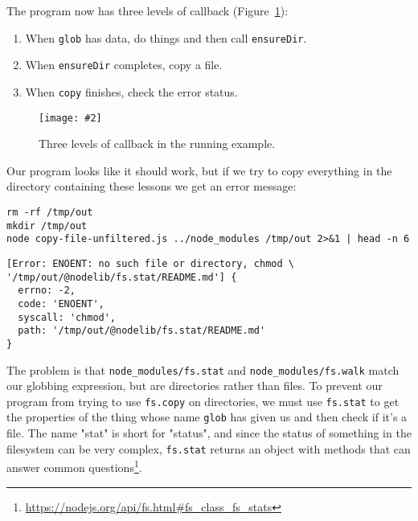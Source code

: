 \documentclass[krantzl]{krantz}
\newcommand{\figpdf}[4]{\begin{figure}%
\centering%
\texttt{[image: \#2]}%
\caption{#3}%
\label{#1}%
\end{figure}}
\newcommand{\figref}[1]{Figure~\ref{#1}}
\newcommand{\hreffoot}[2]{{#1}\footnote{\href{#2}{#2}}}
\begin{document}
The program now has three levels of callback
(\figref{systems-programming-triple-callback}):

\begin{enumerate}

\item 

When \texttt{glob} has data, do things and then call \texttt{ensureDir}.



\item 

When \texttt{ensureDir} completes, copy a file.



\item 

When \texttt{copy} finishes, check the error status.



\end{enumerate}

\figpdf{systems-programming-triple-callback}{./systems-programming/triple-callback.pdf}{Three levels of callback in the running example.}{0.6}


Our program looks like it should work,
but if we try to copy everything in the directory containing these lessons
we get an error message:


\begin{lstlisting}[frame=single,frameround=tttt]
rm -rf /tmp/out
mkdir /tmp/out
node copy-file-unfiltered.js ../node_modules /tmp/out 2>&1 | head -n 6
\end{lstlisting}



\begin{lstlisting}[frame=single,frameround=tttt]
[Error: ENOENT: no such file or directory, chmod \
'/tmp/out/@nodelib/fs.stat/README.md'] {
  errno: -2,
  code: 'ENOENT',
  syscall: 'chmod',
  path: '/tmp/out/@nodelib/fs.stat/README.md'
}
\end{lstlisting}



The problem is that \texttt{node\_modules/fs.stat} and \texttt{node\_modules/fs.walk} match our globbing expression,
but are directories rather than files.
To prevent our program from trying to use \texttt{fs.copy} on directories,
we must use \texttt{fs.stat} to get the properties of the thing whose name \texttt{glob} has given us
and then check if it's a file.
The name "stat" is short for "status",
and since the status of something in the filesystem can be very complex,
\texttt{fs.stat}\index{fs.stat} returns \hreffoot{an object with methods that can answer common questions}{https://nodejs.org/api/fs.html\#fs\_class\_fs\_stats}.
\end{document}
